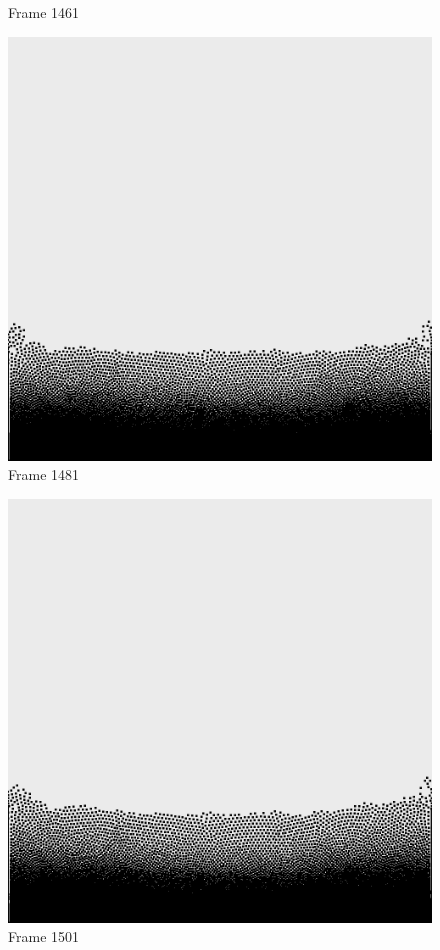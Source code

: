 \documentclass[a4paper, 12pt, oneside]{book}
\begin{document}
\begin{figure}[!ht]
\begin{center}
            Frame 1461
        \end{center}
    \endminipage
    \hfill
        \begin{center}
            \includegraphics[width=\linewidth]{images/test_case_1/1481.png}
            Frame 1481
        \end{center}
    \endminipage
    \hfill
        \begin{center}
            \includegraphics[width=\linewidth]{images/test_case_1/1501.png}
            Frame 1501
        \end{center}
    \endminipage
    \hfill


\end{figure}
\end{document}

